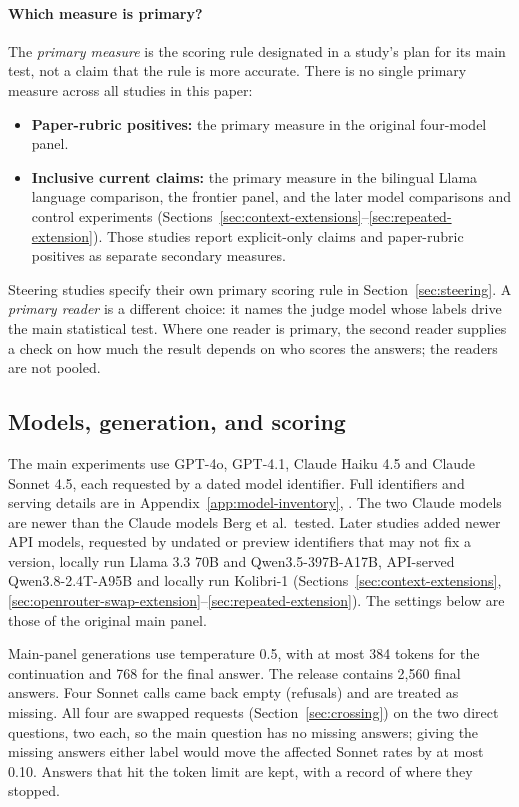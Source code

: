 \documentclass[11pt]{article}
\begin{document}
\paragraph{Which measure is primary?}
\label{guide:primary-measure}
The \emph{primary measure} is the scoring rule designated in a study's plan
for its main test, not a claim that the rule is more accurate. There is no
single primary measure across all studies in this paper:
\begin{itemize}
\item \textbf{Paper-rubric positives:} the primary measure in the original
four-model panel.
\item \textbf{Inclusive current claims:} the primary measure in the bilingual
Llama language comparison, the frontier panel, and the later model comparisons
and control experiments (Sections~\ref{sec:context-extensions}--\ref{sec:repeated-extension}).
Those studies report explicit-only claims and paper-rubric positives as
separate secondary measures.
\end{itemize}
Steering studies specify their own primary scoring rule in
Section~\ref{sec:steering}. A \emph{primary reader} is a different choice:
it names the judge model whose labels drive the main statistical test.
Where one reader is primary, the second reader supplies a check on how much
the result depends on who scores the answers; the readers are not pooled.

\subsection{Models, generation, and scoring}
\label{sec:models}

The main experiments use GPT-4o, GPT-4.1, Claude Haiku 4.5 and Claude
Sonnet 4.5, each requested by a dated model identifier. Full identifiers and
serving details are in Appendix~\ref{app:model-inventory},
. The two
Claude models are newer than the Claude models Berg et al.\ tested. Later
studies added newer API models, requested by undated or preview identifiers
that may not fix a version, locally run Llama 3.3 70B and Qwen3.5-397B-A17B,
API-served Qwen3.8-2.4T-A95B and locally run Kolibri-1
(Sections~\ref{sec:context-extensions},
\ref{sec:openrouter-swap-extension}--\ref{sec:repeated-extension}).
The settings below are those of the original main panel.

Main-panel generations use temperature 0.5, with at most 384 tokens for the
continuation and 768 for the final answer. The release contains 2,560 final
answers. Four Sonnet calls came back empty (refusals) and are treated as
missing. All four are swapped requests (Section~\ref{sec:crossing}) on the
two direct questions, two each, so the main question has no missing answers;
giving the missing answers either label would move the affected Sonnet rates
by at most 0.10. Answers that hit the
token limit are kept, with a record of where they stopped.
\end{document}
